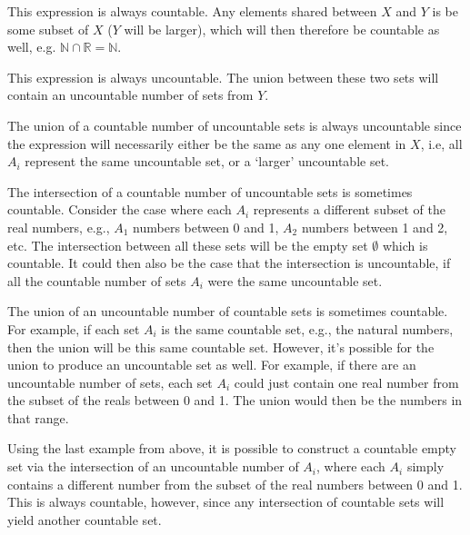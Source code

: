 \documentclass[11pt]{article}
\begin{document}
\begin{solution}
    \begin{Parts}
        
    \Part This expression is always countable. Any elements shared between $X$ and 
    $Y$ is be some subset of $X$ ($Y$ will be larger), which will then therefore
    be countable as well, e.g. $\mathbb{N} \cap \mathbb{R} = \mathbb{N}$. 

    \Part This expression is always uncountable. The union between these two sets will
    contain an uncountable number of sets from $Y$.

    \Part The union of a countable number of uncountable sets is always uncountable
    since the expression will necessarily either be the same as any one element
    in $X$, i.e, all $A_i$ represent the same uncountable set, or a `larger' 
    uncountable set.

    \Part The intersection of a countable number of uncountable sets is sometimes
    countable. Consider the case where each $A_i$ represents a different 
    subset of the real numbers, e.g., $A_1$ numbers between 0 and 1, $A_2$
    numbers between 1 and 2, etc. The intersection between all these sets 
    will be the empty set $\emptyset$ which is countable. It could then also
    be the case that the intersection is uncountable, if all the countable
    number of sets $A_i$ were the same uncountable set. 

    \Part The union of an uncountable number of countable sets is sometimes countable.
    For example, if each set $A_i$ is the same countable set, e.g., the natural
    numbers, then the union will be this same countable set. However, it's
    possible for the union to produce an uncountable set as well. For example, 
    if there are an uncountable number of sets, each set $A_i$ could just contain
    one real number from the subset of the reals between 0 and 1. The union would
    then be the numbers in that range.

    \Part Using the last example from above, it is possible to construct a countable 
    empty set via the intersection of an uncountable number of $A_i$, where 
    each $A_i$ simply contains a different number from the subset of the real 
    numbers between 0 and 1. This is always countable, however, since any 
    intersection of countable sets will yield another countable set.

    \end{Parts}
\end{solution}
\end{document}
